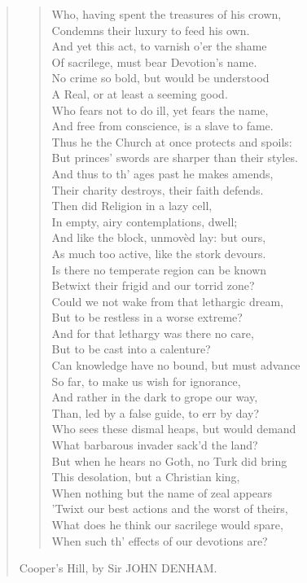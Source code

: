 \begin{verse}
{\begin{verse}
Who, having spent the treasures of his crown, \\
Condemns their luxury to feed his own. \\
And yet this act, to varnish o'er the shame \\
Of sacrilege, must bear Devotion's name. \\
No crime so bold, but would be understood \\
A Real, or at least a seeming good. \\
Who fears not to do ill, yet fears the name, \\
And free from conscience, is a slave to fame. \\
Thus he the Church at once protects and spoils: \\
But princes' swords are sharper than their styles. \\
And thus to th' ages past he makes amends, \\
Their charity destroys, their faith defends. \\
Then did Religion in a lazy cell, \\
In empty, airy contemplations, dwell; \\
And like the block, unmovèd lay: but ours, \\
As much too active, like the stork devours. \\
Is there no temperate region can be known \\
Betwixt their frigid and our torrid zone? \\
Could we not wake from that lethargic dream, \\
But to be restless in a worse extreme? \\
And for that lethargy was there no care, \\
But to be cast into a calenture? \\
Can knowledge have no bound, but must advance \\
So far, to make us wish for ignorance, \\
And rather in the dark to grope our way, \\
Than, led by a false guide, to err by day? \\
Who sees these dismal heaps, but would demand \\
What barbarous invader sack'd the land? \\
But when he hears no Goth, no Turk did bring \\
This desolation, but a Christian king, \\
When nothing but the name of zeal appears \\
'Twixt our best actions and the worst of theirs, \\
What does he think our sacrilege would spare, \\
When such th' effects of our devotions are?
\end{verse}

\hfill Cooper's Hill, by Sir JOHN DENHAM.
}

\end{verse}

